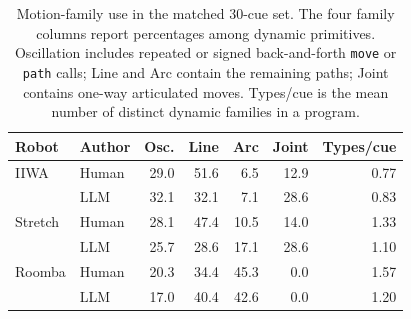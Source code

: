 \begin{table}[t]
\centering
\small
\setlength{\tabcolsep}{3.0pt}
\renewcommand{\arraystretch}{1.05}
\begin{tabular}{@{}llrrrrr@{}}
\toprule
\textbf{Robot} & \textbf{Author} & \textbf{Osc.} & \textbf{Line} & \textbf{Arc} & \textbf{Joint} & \textbf{Types/cue} \\
\midrule
IIWA & Human & 29.0 & 51.6 & 6.5 & 12.9 & 0.77 \\
 & LLM & 32.1 & 32.1 & 7.1 & 28.6 & 0.83 \\
\addlinespace[1pt]
Stretch & Human & 28.1 & 47.4 & 10.5 & 14.0 & 1.33 \\
 & LLM & 25.7 & 28.6 & 17.1 & 28.6 & 1.10 \\
\addlinespace[1pt]
Roomba & Human & 20.3 & 34.4 & 45.3 & 0.0 & 1.57 \\
 & LLM & 17.0 & 40.4 & 42.6 & 0.0 & 1.20 \\
\bottomrule
\end{tabular}
\caption{Motion-family use in the matched 30-cue set. The four family columns report percentages among dynamic primitives. Oscillation includes repeated or signed back-and-forth \texttt{move} or \texttt{path} calls; Line and Arc contain the remaining paths; Joint contains one-way articulated moves. Types/cue is the mean number of distinct dynamic families in a program.}
\label{tab:nonanthro-motion-families}
\end{table}
